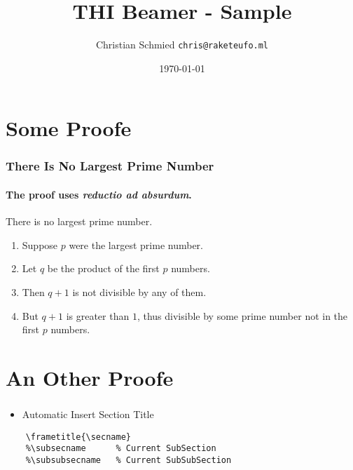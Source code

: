 \documentclass[aspectratio=169]{beamer}
\title{THI Beamer - Sample}
\date{\today}
\author{Christian Schmied \texttt{chris@raketeufo.ml}}
\begin{document}

\def \thititleB {Präsentationen mit \LaTeX}


\maketitle

\frame{\tableofcontents[hideallsubsections]}


\section{Some Proofe}
\begin{frame}
    \frametitle{There Is No Largest Prime Number} 
    \framesubtitle{The proof uses \textit{reductio ad absurdum}.} 
    \begin{theorem}
    There is no largest prime number.
    \end{theorem} 
    \begin{enumerate} 
    \item<1-| alert@1> Suppose $p$ were the largest prime number. 
    \item<2-> Let $q$ be the product of the first $p$ numbers. 
    \item<3-> Then $q+1$ is not divisible by any of them. 
    \item<1-> But $q + 1$ is greater than $1$, thus divisible by some prime
    number not in the first $p$ numbers.
    \end{enumerate}
\end{frame}

\section{An Other Proofe}  
\begin{frame}[fragile]
    \frametitle{\secname}
    \begin{itemize}
    \item Automatic Insert Section Title
    \end{itemize}
    \begin{example}
        \begin{lstlisting}
    \frametitle{\secname}
    %\subsecname      % Current SubSection
    %\subsubsecname   % Current SubSubSection
        \end{lstlisting}
    \end{example}
\end{frame}
\end{document}
